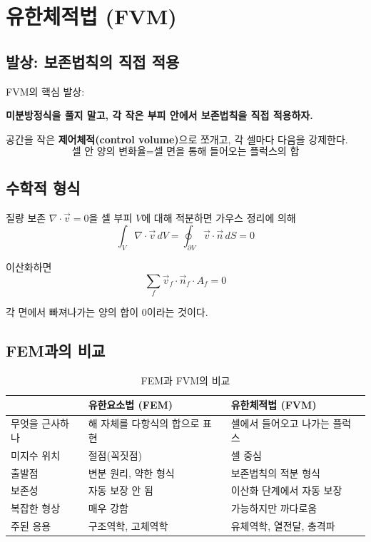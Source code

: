 \documentclass[11pt,a4paper]{article}
\begin{document}
\section{유한체적법 (FVM)}

\subsection{발상: 보존법칙의 직접 적용}

FVM의 핵심 발상:

\begin{quotebox}
\textbf{미분방정식을 풀지 말고, 각 작은 부피 안에서 보존법칙을 직접 적용하자.}
\end{quotebox}

공간을 작은 \textbf{제어체적(control volume)}으로 쪼개고, 각 셀마다 다음을 강제한다.
\[
\text{셀 안 양의 변화율} = \text{셀 면을 통해 들어오는 플럭스의 합}
\]

\subsection{수학적 형식}

질량 보존 $\nabla \cdot \vec{v} = 0$을 셀 부피 $V$에 대해 적분하면 가우스 정리에 의해
\[
\int_V \nabla \cdot \vec{v}\, dV = \oint_{\partial V} \vec{v} \cdot \vec{n}\, dS = 0
\]

이산화하면
\[
\sum_{f} \vec{v}_f \cdot \vec{n}_f \cdot A_f = 0
\]

각 면에서 빠져나가는 양의 합이 0이라는 것이다.

\subsection{FEM과의 비교}

\begin{table}[h]
\centering
\small
\begin{tabular}{p{4cm}p{5cm}p{5cm}}
\toprule
& \textbf{유한요소법 (FEM)} & \textbf{유한체적법 (FVM)} \\
\midrule
무엇을 근사하나 & 해 자체를 다항식의 합으로 표현 & 셀에서 들어오고 나가는 플럭스 \\
미지수 위치 & 절점(꼭짓점) & 셀 중심 \\
출발점 & 변분 원리, 약한 형식 & 보존법칙의 적분 형식 \\
보존성 & 자동 보장 안 됨 & 이산화 단계에서 자동 보장 \\
복잡한 형상 & 매우 강함 & 가능하지만 까다로움 \\
주된 응용 & 구조역학, 고체역학 & 유체역학, 열전달, 충격파 \\
\bottomrule
\end{tabular}
\caption{FEM과 FVM의 비교}
\end{table}
\end{document}
